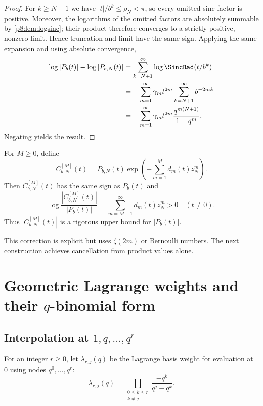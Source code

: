 \documentclass[11pt]{article}
\numberwithin{equation}{section}
\theoremstyle{definition}
\theoremstyle{remark}
\begin{document}
\begin{proof}
For $k\ge N+1$ we have $|t|/b^k\le\rho_N<\pi$, so every omitted sinc factor is positive.
Moreover, the logarithms of the omitted factors are absolutely summable by
\cref{p8:lem:logsinc}; their product therefore converges to a strictly positive, nonzero
limit.  Hence truncation and limit have the same sign.  Applying the same expansion and
using absolute convergence,
\begin{align*}
\log|P_b(t)|-\log|P_{b,N}(t)|
&=\sum_{k=N+1}^{\infty}\log\SincRad(t/b^k)\\
&=-\sum_{m=1}^{\infty}\gamma_m t^{2m}
\sum_{k=N+1}^{\infty}b^{-2mk}\\
&=-\sum_{m=1}^{\infty}\gamma_m t^{2m}
\frac{q^{m(N+1)}}{1-q^m}.
\end{align*}
Negating yields the result.
\end{proof}

\begin{corollary}
\label{p8:cor:analytic-correction}
For $M\ge0$, define
\begin{equation}
C_{b,N}^{[M]}(t)=P_{b,N}(t)
\exp\!\left(-\sum_{m=1}^{M}d_m(t)z_N^m\right).
\label{p8:eq:analytic-corrected}
\end{equation}
Then $C_{b,N}^{[M]}(t)$ has the same sign as $P_b(t)$ and
\begin{equation}
\log\frac{|C_{b,N}^{[M]}(t)|}{|P_b(t)|}
=\sum_{m=M+1}^{\infty}d_m(t)z_N^m>0
\quad(t\ne0).
\label{p8:eq:analytic-correction-error}
\end{equation}
Thus $|C_{b,N}^{[M]}(t)|$ is a rigorous upper bound for $|P_b(t)|$.
\end{corollary}

This correction is explicit but uses $\zeta(2m)$ or Bernoulli numbers. The next construction achieves cancellation from product values alone.

\section{Geometric Lagrange weights and their \texorpdfstring{$q$}{q}-binomial form}
\label{p8:sec:qweights}

\subsection{Interpolation at \texorpdfstring{$1,q,\ldots,q^r$}{1, q, ..., q-to-the-r}}

For an integer $r\ge0$, let $\lambda_{r,j}(q)$ be the Lagrange basis weight for evaluation at $0$ using nodes $q^0,\ldots,q^r$:
\begin{equation}
\lambda_{r,j}(q)=\prod_{\substack{0\le k\le r\\k\ne j}}
\frac{-q^k}{q^j-q^k}.
\label{p8:eq:lambda-def-q}
\end{equation}
\end{document}
